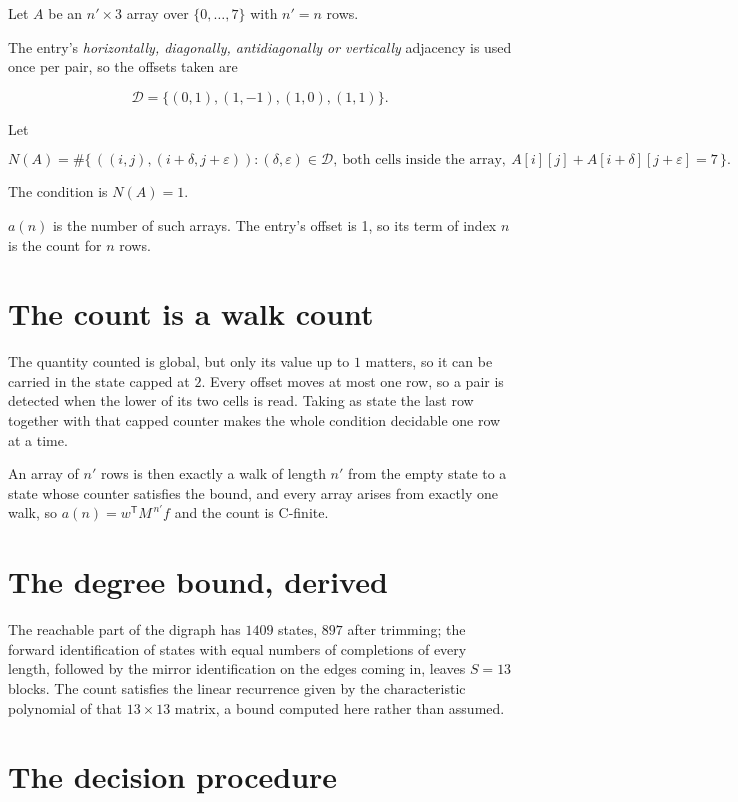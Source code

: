 \documentclass[11pt]{article}
\theoremstyle{definition}
\begin{document}
Let $A$ be an $n' \times 3$ array over $\{0,\dots,7\}$ with $n' = n$ rows.

The entry's {\itshape horizontally, diagonally, antidiagonally or vertically} adjacency is used once per pair, so the offsets taken are

\[\mathcal{D} = \{(0,1), (1,-1), (1,0), (1,1)\}.\]

Let

\[N(A) = \#\bigl\{\,((i,j),(i{+}\delta,j{+}\varepsilon)) : (\delta,\varepsilon) \in \mathcal{D},\ \text{both cells inside the array},\ A[i][j] + A[i{+}\delta][j{+}\varepsilon] = 7\,\bigr\}.\]

The condition is $N(A) = 1$.

$a(n)$ is the number of such arrays. The entry's offset is 1, so its term of index $n$ is the count for $n$ rows.

\section{The count is a walk count}

The quantity counted is global, but only its value up to $1$ matters, so it can be carried in the state capped at $2$. Every offset moves at most one row, so a pair is detected when the lower of its two cells is read. Taking as state the last row together with that capped counter makes the whole condition decidable one row at a time.

An array of $n'$ rows is then exactly a walk of length $n'$ from the empty state to a state whose counter satisfies the bound, and every array arises from exactly one walk, so $a(n) = w^{\mathsf T}M^{\,n'}f$ and the count is C-finite.

\section{The degree bound, derived}

The reachable part of the digraph has $1409$ states, $897$ after trimming; the forward identification of states with equal numbers of completions of every length, followed by the mirror identification on the edges coming in, leaves $S = 13$ blocks. The count satisfies the linear recurrence given by the characteristic polynomial of that $13\times13$ matrix, a bound computed here rather than assumed.

\section{The decision procedure}
\end{document}
